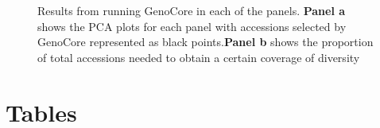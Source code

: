 \documentclass[utf8]{FrontiersinHarvard} %
\begin{document}
\begin{figure}[h]
	\caption{Results from running GenoCore in each of the panels. \textbf{Panel a} shows the PCA plots for each panel with accessions selected by GenoCore represented as black points.\textbf{Panel b} shows the proportion of total accessions needed to obtain a certain coverage of diversity \label{fig:9}}
\end{figure}




\clearpage

\section*{Tables}
\end{document}
